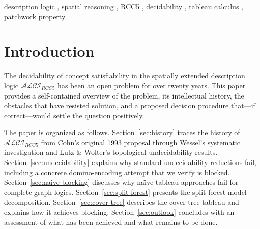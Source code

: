 \documentclass[
]{ceurart}
\theoremstyle{definition}
\newcommand{\ALCIRCC}[1]{\ensuremath{\mathcal{ALCI}_{\mathit{RCC#1}}}}
\begin{document}
\begin{keywords}
  description logic \sep
  spatial reasoning \sep
  RCC5 \sep
  decidability \sep
  tableau calculus \sep
  patchwork property
\end{keywords}

\maketitle

\section{Introduction}
\label{sec:intro}

The decidability of concept satisfiability in the spatially extended
description logic $\ALCIRCC{5}$ has been an open problem for over
twenty years.  This paper provides a self-contained overview of the
problem, its intellectual history, the obstacles that have resisted
solution, and a proposed decision procedure that---if correct---would
settle the question positively.

The paper is organized as follows.
Section~\ref{sec:history} traces the history of $\ALCIRCC{5}$
from Cohn's original 1993 proposal through Wessel's systematic
investigation and Lutz \& Wolter's topological undecidability results.
Section~\ref{sec:undecidability} explains why standard undecidability
reductions fail, including a concrete domino-encoding attempt that
we verify is blocked.
Section~\ref{sec:naive-blocking} discusses why na\"{\i}ve tableau
approaches fail for complete-graph logics.
Section~\ref{sec:split-forest} presents the split-forest model
decomposition.
Section~\ref{sec:cover-tree} describes the cover-tree tableau and
explains how it achieves blocking.
Section~\ref{sec:outlook} concludes with an assessment of what
has been achieved and what remains to be done.
\end{document}

